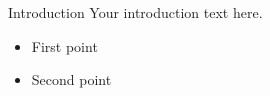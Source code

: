 \begin{block}{Introduction}
  Your introduction text here.
  \begin{itemize}
    \item First point
    \item Second point
  \end{itemize}
\end{block}